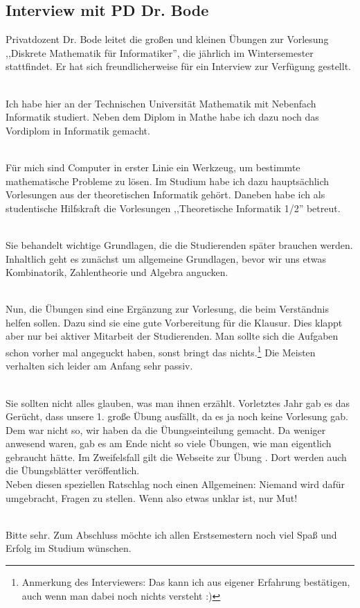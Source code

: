 \subsection{Interview mit PD Dr. Bode}

Privatdozent Dr. Bode leitet die großen und kleinen Übungen zur
Vorlesung ,,Diskrete Mathematik für Informatiker'', die jährlich im
Wintersemester stattfindet.  Er hat sich
freundlicherweise für ein Interview zur Verfügung gestellt.

\\
Ich habe hier an der Technischen Universität Mathematik mit Nebenfach
Informatik studiert. Neben dem Diplom in Mathe habe ich dazu noch das
Vordiplom in Informatik gemacht.

\\
Für mich sind Computer in erster Linie ein Werkzeug, um bestimmte
mathematische Probleme zu lösen. Im Studium habe ich dazu
hauptsächlich Vorlesungen aus der theoretischen Informatik
gehört. Daneben habe ich als studentische Hilfskraft die Vorlesungen
,,Theoretische Informatik 1/2'' betreut.

\\
Sie behandelt wichtige Grundlagen, die die Studierenden später
brauchen werden. Inhaltlich geht es zunächst um allgemeine Grundlagen,
bevor wir uns etwas Kombinatorik, Zahlentheorie und Algebra angucken.

\\
Nun, die Übungen sind eine Ergänzung zur Vorlesung, die beim
Verständnis helfen sollen. Dazu sind sie eine gute Vorbereitung für
die Klausur. Dies klappt aber nur bei aktiver Mitarbeit der
Studierenden. Man sollte sich die Aufgaben schon vorher mal angeguckt
haben, sonst bringt das nichts.\footnote{Anmerkung des Interviewers:
Das kann ich aus eigener Erfahrung bestätigen, auch wenn man dabei
noch nichts versteht :)} Die Meisten verhalten sich leider am Anfang
sehr passiv.

\\
Sie sollten  nicht alles glauben, was man ihnen
erzählt. Vorletztes Jahr gab es das Gerücht, dass unsere 1. große Übung
ausfällt, da es ja noch keine Vorlesung gab. Dem war nicht so, wir
haben da die Übungseinteilung gemacht. Da weniger anwesend waren, gab
es am Ende nicht so viele Übungen, wie man eigentlich gebraucht
hätte. Im Zweifelsfall gilt die Webseite zur Übung
. Dort werden auch die
Übungsblätter veröffentlich.\\
Neben diesen speziellen Ratschlag noch einen Allgemeinen: Niemand wird
dafür umgebracht, Fragen zu stellen. Wenn also etwas unklar ist, nur
Mut!

\\
Bitte sehr. Zum Abschluss möchte ich allen Erstsemestern noch viel
Spaß und Erfolg im Studium wünschen.
